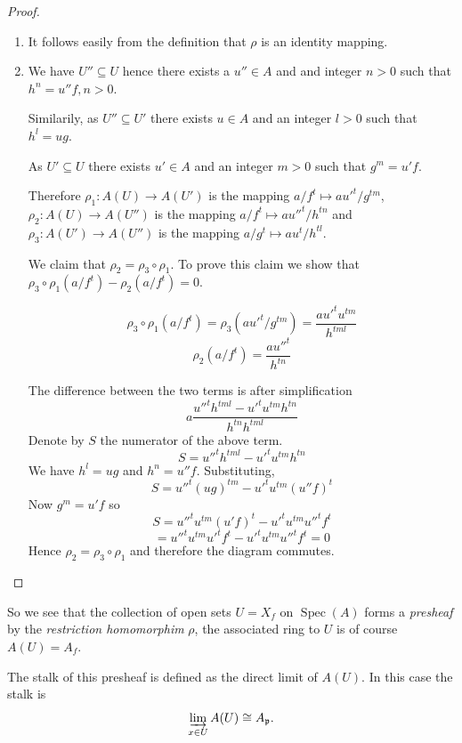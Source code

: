 \documentclass[]{report}
\DeclareMathOperator\Spec{Spec}
\newcommand\mfk[1]{\mathfrak{#1}}
\begin{document}
\begin{proof}
    \begin{enumerate}
        \item It follows easily from the definition that $\rho$ is an identity mapping. 
        \item We have $U'' \subseteq U$ hence there exists a $u'' \in A$ and and integer $n>0$ such that $h^n = u''f, n>0$.

            Similarily, as $U'' \subseteq U'$ there exists $u \in A$ and an integer $l > 0$ such that $h^l = ug$. 

            As $U' \subseteq U$ there exists $u' \in A$ and an integer $m > 0$ such that $g^m = u'f$.

            Therefore $\rho_1 : A(U) \rightarrow A(U')$ is the mapping $a/f^t \mapsto a{u'}^t/g^{tm}$, $\rho_2: A(U) \rightarrow A(U'')$ is the mapping $a/f^t \mapsto a{u''}^t/h^{tn}$ and $\rho_3: A(U') \rightarrow A(U'')$ is the mapping $a/g^t \mapsto au^t/h^{tl}$.

            We claim that $\rho_2 = \rho_3 \circ \rho_1$. To prove this claim we show that $\rho_3 \circ \rho_1 (a/f^t) - \rho_2(a/f^t) = 0$.

            $$\rho_3 \circ \rho_1 (a/f^t) = \rho_3(a{u'}^t/g^{tm}) = \frac{a{u'}^t u^{tm}}{h^{tml}}$$
            $$\rho_2(a/f^t) = \frac{a{u''}^t}{h^{tn}}$$
            
        The difference between the two terms is after simplification
        $$a\frac{{u''}^t h^{tml} - {u'}^t u^{tm} h^{tn}}{h^{tn} h^{tml}}$$
        Denote by $S$ the numerator of the above term. 
        $$S = {u''}^t h^{tml} - {u'}^t u^{tm} h^{tn}$$
        We have $h^l = ug$ and $h^n = u''f$. Substituting,
        $$S = {u''}^t (ug)^{tm} - {u'}^t u^{tm} (u''f)^t$$
        Now $g^m = u'f$ so 
        $$S = {u''}^t u^{tm} (u'f)^t - {u'}^t u^{tm} {u''}^t f^t$$
        $$= {u''}^t u^{tm} {u'}^t f^t - {u'}^t u^{tm} {u''}^t f^t = 0$$
        Hence $\rho_2 = \rho_3 \circ \rho_1$ and therefore the diagram commutes.
    \end{enumerate}
\end{proof}

So we see that the collection of open sets $U = X_f$ on $\Spec(A)$ forms a \textit{presheaf} by the \textit{restriction homomorphim} $\rho$, the associated ring to $U$ is of course $A(U) = A_f$.

    The stalk of this presheaf is defined as the direct limit of $A(U)$. In this case the stalk is
    $$\varinjlim_{x \in U} A(U) \cong A_\mfk{p}.$$
\end{document}

